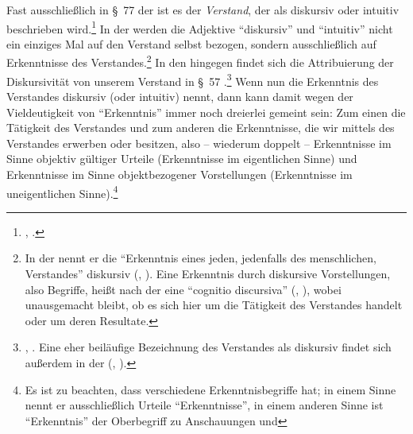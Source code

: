 \begin{nummerierung}
\item Fast ausschließlich in \S~77 der  ist es
der \emph{Verstand}, der als diskursiv oder intuitiv beschrieben
wird.\footnote{\cite[Vgl.][\S~77]{Kant:KritikderUrteilskraft2009}, \cite[][V:
407.19--21]{Kant:GesammelteWerke1900ff.}.} In der  werden die Adjektive \enquote{diskursiv} und \enquote{intuitiv} nicht ein
einziges Mal auf den Verstand selbst bezogen, sondern ausschließlich auf
Erkenntnisse des Verstandes.\footnote{In der  nennt er die
\enquote{Erkenntnis eines jeden, jedenfalls des menschlichen, Verstandes}
diskursiv \mkbibparens{\cite[][B 93]{Kant:KritikderreinenVernunft2003},
\cite[][III: 85.14--15]{Kant:GesammelteWerke1900ff.}}. Eine
Erkenntnis durch diskursive Vorstellungen, also Begriffe, heißt nach
der  eine \enquote{cognitio
discursiva} \mkbibparens{\cite[][\S~1]{Kant:ImmanuelKantsLogik1977}, \cite[][IX:
91.11]{Kant:GesammelteWerke1900ff.}}, wobei unausgemacht bleibt, ob es sich
hier um die Tätigkeit des Verstandes handelt oder um deren Resultate.} In den
 hingegen findet sich die Attribuierung der Diskursivität von
unserem Verstand in \S~57 .\footnote{\cite[Siehe][A 163\,f.,
172]{Kant:ProlegomenazueinerjedenkuenftigenMetaphysikdiealsWissenschaftwirdauftretenkoennen1977},
\cite[][IV: 351.2--3, 355.7]{Kant:GesammelteWerke1900ff.}. Eine eher beiläufige
Bezeichnung des Verstandes als diskursiv findet sich außerdem in der
\mkbibparens{\cite[siehe][A 247]{Kant:KritikderpraktischenVernunft1974}, \cite[][V:
137.12]{Kant:GesammelteWerke1900ff.}}.} Wenn
 nun die Erkenntnis des Verstandes diskursiv (oder
intuitiv) nennt, dann kann damit wegen der Vieldeutigkeit von
\enquote{Erkenntnis} immer noch dreierlei gemeint
sein: Zum einen die Tätigkeit des Verstandes und zum anderen die Erkenntnisse,
die wir mittels des Verstandes erwerben oder besitzen, also -- wiederum doppelt
-- Erkenntnisse im Sinne objektiv gültiger Urteile (Erkenntnisse im eigentlichen
Sinne) und Erkenntnisse im Sinne objektbezogener Vorstellungen (Erkenntnisse im
uneigentlichen
Sinne).\footnote{\label{Anmerkung:ErkenntnisInZweierleiSinn}Es
ist zu beachten, dass  verschiedene Erkenntnisbegriffe hat;
in einem Sinne nennt er ausschließlich Urteile \enquote{Erkenntnisse}, in einem
anderen Sinne ist \enquote{Erkenntnis} der Oberbegriff zu Anschauungen und
}
\end{nummerierung}
